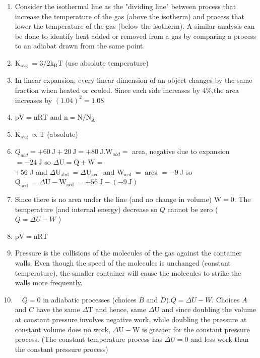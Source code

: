 \begin{enumerate}
\begin{enumerate}
  \item Consider the isothermal line as the "dividing line" between process that increase the temperature of the gas (above the isotherm) and process that lower the temperature of the gas (below the isotherm). A similar analysis can be done to identify heat added or removed from a gas by comparing a process to an adiabat drawn from the same point.
  \item $\mathrm{K}_{\text {avg }}=3 / 2 \mathrm{k}_{\mathrm{B}} \mathrm{T}$ (use absolute temperature)
  \item In linear expansion, every linear dimension of an object changes by the same fraction when heated or cooled. Since each side increases by $4 \%$,the area increases by $(1.04)^{2}=1.08$
  \item $\mathrm{pV}=\mathrm{nRT}$ and $\mathrm{n}=\mathrm{N} / \mathrm{N}_{\mathrm{A}}$
  \item $\mathrm{K}_{\text {avg }} \propto \mathrm{T}$ (absolute)
  \item $Q_{a b d}=+60 \mathrm{~J}+20 \mathrm{~J}=+80 \mathrm{~J} . \mathrm{W}_{a b d}=$ area, negative due to expansion $=-24 \mathrm{~J}$ so $\Delta \mathrm{U}=\mathrm{Q}+\mathrm{W}=$\\
+56 J and $\Delta \mathrm{U}_{\text {abd }}=\Delta \mathrm{U}_{\text {acd }}$ and $\mathrm{W}_{\text {acd }}=\operatorname{area}=-9 \mathrm{~J}$ so $\mathrm{Q}_{\text {acd }}=\Delta \mathrm{U}-\mathrm{W}_{\text {acd }}=+56 \mathrm{~J}-(-9 \mathrm{~J})$
  \item Since there is no area under the line (and no change in volume) $\mathrm{W}=0$. The temperature (and internal energy) decrease so $Q$ cannot be zero ( $Q=\Delta U-W$ )
  \item $\mathrm{pV}=\mathrm{nRT}$
  \item Pressure is the collisions of the molecules of the gas against the container walls. Even though the speed of the molecules is unchanged (constant temperature), the smaller container will cause the molecules to strike the walls more frequently.
  \item $\quad Q=0$ in adiabatic processes (choices $B$ and $D) . Q=\Delta U-W$. Choices $A$ and $C$ have the same $\Delta \mathrm{T}$ and hence, same $\Delta \mathrm{U}$ and since doubling the volume at constant pressure involves negative work, while doubling the pressure at constant volume does no work, $\Delta \mathrm{U}-\mathrm{W}$ is greater for the constant pressure process. (The constant temperature process has $\Delta U=0$ and less work than the constant pressure process)

\end{enumerate}
\end{enumerate}
